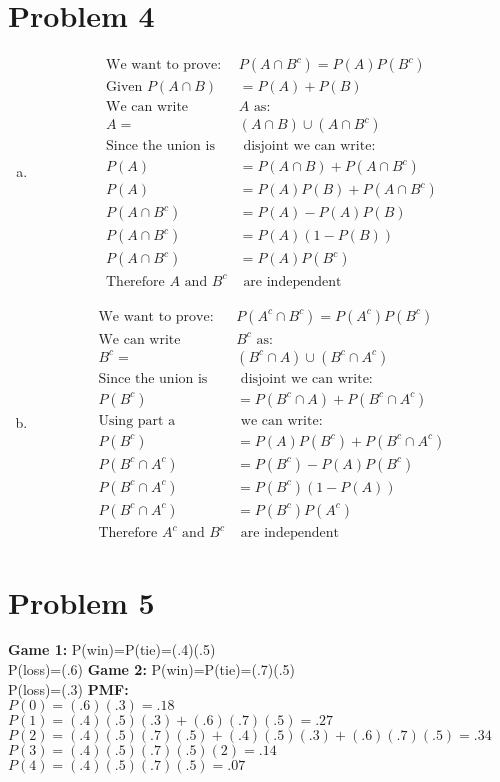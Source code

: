\documentclass{article}
\begin{document}
\begin{flushleft}
\section*{Problem 4}
\begin{enumerate}[(a)]
\item
\begin{align*}
\text{We want to prove: } &P(A\cap B^c)=P(A)P(B^c)\\
\text{Given } P(A\cap B)&=P(A)+P(B)\\
\text{We can write } &A \text{ as:}\\
A=&(A\cap B)\cup (A\cap B^c)\\
\text{Since the union is}&\text{ disjoint we can write:}\\
P(A)&=P(A\cap B)+P(A\cap B^c)\\
P(A)&=P(A)P(B)+P(A\cap B^c)\\
P(A\cap B^c)&=P(A)-P(A)P(B)\\
P(A\cap B^c)&=P(A)(1-P(B))\\
P(A\cap B^c)&=P(A)P(B^c)\\
\text{Therefore } A \text{ and } B^c & \text{ are independent}
\end{align*}
\item
\begin{align*}
\text{We want to prove: }& P(A^c\cap B^c)=P(A^c)P(B^c)\\
\text{We can write } &B^c \text{ as:}\\
B^c=&(B^c\cap A)\cup (B^c\cap A^c)\\
\text{Since the union is}&\text{ disjoint we can write:}\\
P(B^c)&=P(B^c\cap A)+P(B^c\cap A^c)\\
\text{Using part a}&\text{ we can write:}\\
P(B^c)&=P(A)P(B^c)+P(B^c\cap A^c)\\
P(B^c\cap A^c)&=P(B^c)-P(A)P(B^c)\\
P(B^c\cap A^c)&=P(B^c)(1-P(A))\\
P(B^c\cap A^c)&=P(B^c)P(A^c)\\
\text{Therefore } A^c \text{ and } B^c & \text{ are independent}
\end{align*}
\end{enumerate}
\section*{Problem 5}
\textbf{Game 1:} P(win)=P(tie)=(.4)(.5)\\
P(loss)=(.6)\medbreak
\textbf{Game 2:} P(win)=P(tie)=(.7)(.5)\\
P(loss)=(.3)\medbreak
\textbf{PMF:}\\
$P(0)=(.6)(.3)=.18$\\
$P(1)=(.4)(.5)(.3)+(.6)(.7)(.5)=.27$\\
$P(2)=(.4)(.5)(.7)(.5)+(.4)(.5)(.3)+(.6)(.7)(.5)=.34$\\
$P(3)=(.4)(.5)(.7)(.5)(2)=.14$\\
$P(4)=(.4)(.5)(.7)(.5)=.07$
\pagebreak

\end{flushleft}
\end{document}

